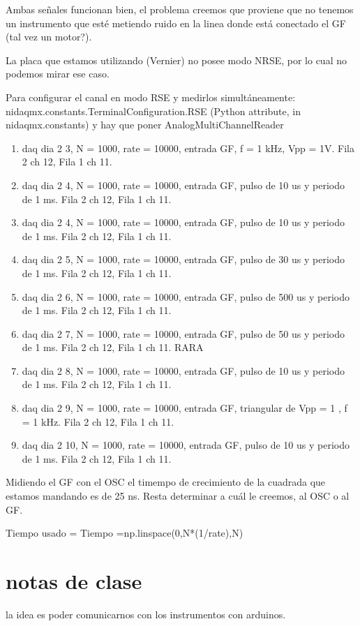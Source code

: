 \documentclass[a4paper,12pt]{article}
\begin{document}
Ambas señales funcionan bien, el problema creemos que proviene que no tenemos un instrumento que esté metiendo ruido en la linea donde está conectado el GF (tal vez un motor?). 

La placa que estamos utilizando (Vernier) no posee modo NRSE, por lo cual no podemos mirar ese caso.

Para configurar el canal en modo RSE y medirlos simultáneamente:
nidaqmx.constants.TerminalConfiguration.RSE (Python attribute, in nidaqmx.constants)
y hay que poner AnalogMultiChannelReader


\begin{enumerate}
    \item daq dia 2 3, N = 1000, rate = 10000, entrada GF, f = 1 kHz, Vpp = 1V. Fila 2 ch 12, Fila 1 ch 11.
    \item daq dia 2 4, N = 1000, rate = 10000, entrada GF, pulso de 10 us y periodo de 1 ms. Fila 2 ch 12, Fila 1 ch 11.
    \item daq dia 2 4, N = 1000, rate = 10000, entrada GF, pulso de 10 us y periodo de 1 ms. Fila 2 ch 12, Fila 1 ch 11.
    \item daq dia 2 5, N = 1000, rate = 10000, entrada GF, pulso de 30 us y periodo de 1 ms. Fila 2 ch 12, Fila 1 ch 11.
    \item daq dia 2 6, N = 1000, rate = 10000, entrada GF, pulso de 500 us y periodo de 1 ms. Fila 2 ch 12, Fila 1 ch 11.
    \item daq dia 2 7, N = 1000, rate = 10000, entrada GF, pulso de 50 us y periodo de 1 ms. Fila 2 ch 12, Fila 1 ch 11. RARA
    \item daq dia 2 8, N = 1000, rate = 10000, entrada GF, pulso de 10 us y periodo de 1 ms. Fila 2 ch 12, Fila 1 ch 11. 
    \item daq dia 2 9, N = 1000, rate = 10000, entrada GF, triangular de Vpp = 1 , f = 1 kHz. Fila 2 ch 12, Fila 1 ch 11.
    \item daq dia 2 10, N = 1000, rate = 10000, entrada GF, pulso de 10 us y periodo de 1 ms. Fila 2 ch 12, Fila 1 ch 11. 
\end{enumerate}{}

Midiendo el GF con el OSC el timempo de crecimiento de la cuadrada que estamos mandando es de 25 ns. Resta determinar a cuál le creemos, al OSC o al GF.

Tiempo usado = Tiempo =np.linspace(0,N*(1/rate),N)


\section{notas de clase }
la idea es poder comunicarnos con los instrumentos con arduinos. 
\end{document}
